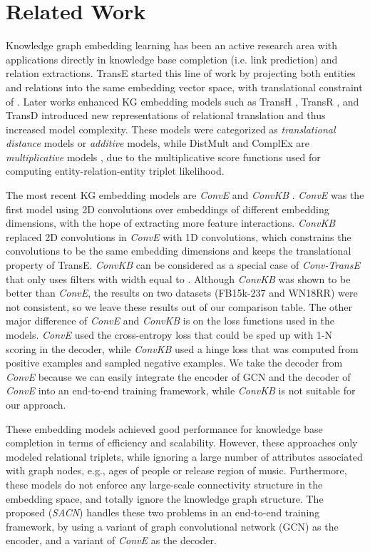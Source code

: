\documentclass[letterpaper]{article} \usepackage{aaai19}  \usepackage{times}  \usepackage{helvet}  \usepackage{courier}  \usepackage{url}  \usepackage{graphicx}  \usepackage{amsmath}
\begin{document}
\section{Related Work}

Knowledge graph embedding learning has been an active research area with applications directly in knowledge base completion (i.e. link prediction) and relation extractions. TransE \cite{bordes2013translating} started this line of work by projecting both entities and relations into the same embedding vector space, with translational constraint of . Later works enhanced KG embedding models such as TransH \cite{wang2014knowledge}, TransR \cite{lin2015learning}, and TransD \cite{ji2015knowledge} introduced new representations of relational translation and thus increased model complexity. These models were categorized as {\it translational distance}  models \cite{wang2017knowledge} or {\it additive} models, while DistMult \cite{yang2014distmult} and ComplEx \cite{trouillon2016complex} are {\it multiplicative} models \cite{sharma2018towards}, due to the multiplicative score functions used for computing entity-relation-entity triplet likelihood.

The most recent KG embedding models are {\it ConvE} \cite{dettmers2017conve} and {\it ConvKB} \cite{nguyen2017novel}. {\it ConvE} was the first model using 2D convolutions over embeddings of different embedding dimensions, with the hope of extracting more feature interactions. {\it ConvKB} replaced 2D convolutions in {\it ConvE} with 1D convolutions, which constrains the convolutions to be the same embedding dimensions and keeps the translational property of TransE. {\it ConvKB} can be considered as a special case of {\it Conv-TransE} that only uses filters with width equal to . Although {\it ConvKB} was shown to be better than {\it ConvE}, the results on two datasets (FB15k-237 and WN18RR) were not consistent, so we leave these results out of our comparison table. The other major difference of {\it ConvE} and {\it ConvKB} is on the loss functions used in the models. {\it ConvE} used the cross-entropy loss that could be sped up with 1-N scoring in the decoder, while {\it ConvKB} used a hinge loss that was computed from positive examples and sampled negative examples. We take the decoder from {\it ConvE} because we can easily integrate the encoder of GCN and the decoder of {\it ConvE} into an end-to-end training framework, while {\it ConvKB} is not suitable for our approach.



These embedding models achieved good performance for knowledge base completion in terms of efficiency and scalability. However, these approaches only modeled relational triplets, while ignoring a large number of attributes associated with graph nodes, e.g., ages of people or release region of music.
Furthermore, these models do not enforce any large-scale connectivity structure in the embedding space, and totally ignore the knowledge graph structure. The proposed ({\it SACN}) handles these two problems in an end-to-end training framework, by using a variant of graph convolutional network (GCN) as the encoder, and a variant of {\it ConvE} as the decoder.
\end{document}
